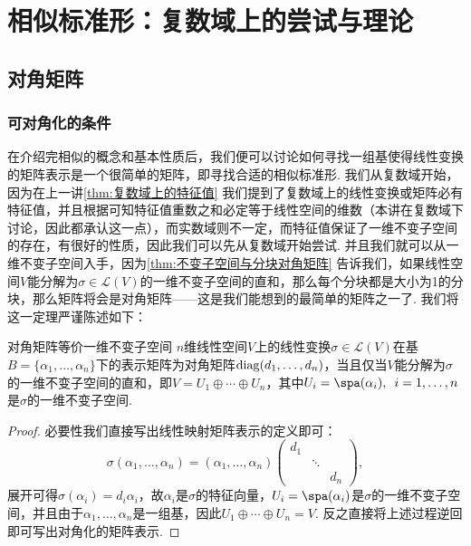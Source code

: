\chapter{相似标准形：复数域上的尝试与理论}

\section{对角矩阵}
\subsection{可对角化的条件}

在介绍完相似的概念和基本性质后，我们便可以讨论如何寻找一组基使得线性变换的矩阵表示是一个很简单的矩阵，即寻找合适的相似标准形. 我们从复数域开始，因为在上一讲\autoref{thm:复数域上的特征值} 我们提到了复数域上的线性变换或矩阵必有特征值，并且根据可知特征值重数之和必定等于线性空间的维数（本讲在复数域下讨论，因此都承认这一点），而实数域则不一定，而特征值保证了一维不变子空间的存在，有很好的性质，因此我们可以先从复数域开始尝试. 并且我们就可以从一维不变子空间入手，因为\autoref{thm:不变子空间与分块对角矩阵} 告诉我们，如果线性空间$V$能分解为$\sigma\in\mathcal{L}(V)$的一维不变子空间的直和，那么每个分块都是大小为1的分块，那么矩阵将会是对角矩阵——这是我们能想到的最简单的矩阵之一了. 我们将这一定理严谨陈述如下：
\begin{theorem}{}{对角矩阵等价一维不变子空间}
    $n$维线性空间$V$上的线性变换$\sigma\in\mathcal{L}(V)$在基$B=\{\alpha_1,\ldots,\alpha_n\}$下的表示矩阵为对角矩阵$\operatorname{diag}(d_1,\ldots,d_n)$，当且仅当$V$能分解为$\sigma$的一维不变子空间的直和，即$V=U_1\oplus\cdots\oplus U_n$，其中$U_i=\spa(\alpha_i),\enspace i=1,\ldots,n$是$\sigma$的一维不变子空间.
\end{theorem}
\begin{proof}
    必要性我们直接写出线性映射矩阵表示的定义即可：
    \[\sigma(\alpha_1,\ldots,\alpha_n)=(\alpha_1,\ldots,\alpha_n)\begin{pmatrix}
            d_1 &        &     \\
                & \ddots &     \\
                &        & d_n
        \end{pmatrix},\]
    展开可得$\sigma(\alpha_i)=d_i\alpha_i$，故$\alpha_i$是$\sigma$的特征向量，$U_i=\spa(\alpha_i)$是$\sigma$的一维不变子空间，并且由于$\alpha_1,\ldots,\alpha_n$是一组基，因此$U_1\oplus\cdots\oplus U_n=V$. 反之直接将上述过程逆回即可写出对角化的矩阵表示.
\end{proof}

